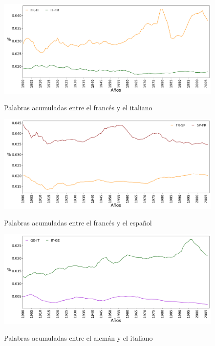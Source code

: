 \begin{figure}[h!]
	\centering
	\includegraphics[scale=.38]{Cap_4/SF_3_S2_FR.png}
	\label{fig.SF_FI}
	\caption{Palabras acumuladas entre el francés y el italiano}
\end{figure}

\begin{figure}[h!]
	\centering
	\includegraphics[scale=.38]{Cap_4/SF_4_S2_FR.png}
	\label{fig.SF_FS}
	\caption{Palabras acumuladas entre el francés y el español}
\end{figure}



\begin{figure}[h!]
	\centering
	\includegraphics[scale=.38]{Cap_4/SF_3_S2_GE.png}
	\label{fig.SF_GI}
	\caption{Palabras acumuladas entre el alemán y el italiano}
\end{figure}


